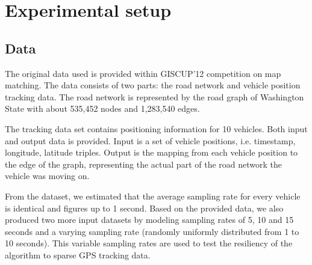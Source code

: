 \documentclass[a4paper,twoside,11pt]{article}
\theoremstyle{plain}
\theoremstyle{definition}  %
\begin{document}


\section{Experimental setup}
\label{sec:experiment}

\subsection*{Data}

The original data used is provided within GISCUP'12 competition on
map matching. The data consists of two parts: the road network and vehicle position tracking data.
The road network is represented by the road graph of Washington State with about
535,452 nodes and 1,283,540 edges.

The tracking data set contains positioning information for 10 vehicles. Both input and
output data is provided. Input is a set of vehicle positions, i.e. timestamp, longitude, latitude triples.
Output is the mapping from each vehicle position to the edge of the graph, representing the actual part of the road network
the vehicle was moving on.

From the dataset, we estimated that the average
sampling rate for every vehicle is identical and figures up to 1 second.
Based on the provided data, we also produced two more input datasets by modeling
sampling rates of 5, 10 and 15 seconds and a varying sampling rate (randomly uniformly
distributed from 1 to 10 seconds). This variable sampling rates are used to test the resiliency of
the algorithm to sparse GPS tracking data.
\end{document}
